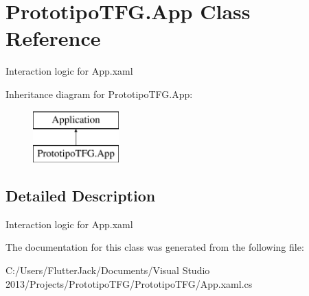 \hypertarget{class_prototipo_t_f_g_1_1_app}{}\section{Prototipo\+T\+F\+G.\+App Class Reference}
\label{class_prototipo_t_f_g_1_1_app}


Interaction logic for App.\+xaml  


Inheritance diagram for Prototipo\+T\+F\+G.\+App\+:\begin{figure}[H]
\begin{center}
\leavevmode
\includegraphics[height=2.000000cm]{class_prototipo_t_f_g_1_1_app}
\end{center}
\end{figure}


\subsection{Detailed Description}
Interaction logic for App.\+xaml 



The documentation for this class was generated from the following file\+:\begin{DoxyCompactItemize}
\item 
C\+:/\+Users/\+Flutter\+Jack/\+Documents/\+Visual Studio 2013/\+Projects/\+Prototipo\+T\+F\+G/\+Prototipo\+T\+F\+G/App.\+xaml.\+cs\end{DoxyCompactItemize}
